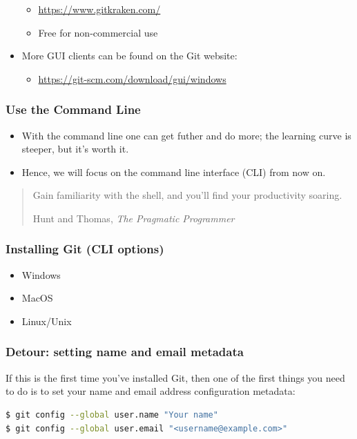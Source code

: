 \documentclass{git_course}
\begin{document}
\begin{frame}
\begin{itemize}
        \begin{itemize}
            \item \url{https://www.gitkraken.com/}
            \item Free for non-commercial use
        \end{itemize}
    \item More GUI clients can be found on the Git website:
        \begin{itemize}
            \item \url{https://git-scm.com/download/gui/windows}
        \end{itemize}
\end{itemize}
\end{frame}

\begin{frame}
\frametitle{Use the Command Line}
\begin{itemize}
    \item With the command line one can get futher and do more; the
        learning curve is steeper, but it's worth it.
    \item Hence, we will focus on the command line interface (CLI) from now
        on.
\end{itemize}
    \blockquote[Hunt and Thomas, \emph{The Pragmatic Programmer}]
    {Gain familiarity with the shell, and you'll find your productivity soaring.}
\end{frame}

\begin{frame}
\frametitle{Installing Git (CLI options)}
\begin{itemize}
    \item Windows
    \item MacOS
    \item Linux/Unix
\end{itemize}
\end{frame}

\begin{frame}[fragile]
    \frametitle{Detour: setting name and email metadata}
    If this is the first time you've installed Git, then one of the first
    things you need to do is to set your name and email address
    configuration metadata:
\begin{lstlisting}[language=bash]
$ git config --global user.name "Your name"
$ git config --global user.email "<username@example.com>"
\end{lstlisting}
\end{frame}
\end{document}
